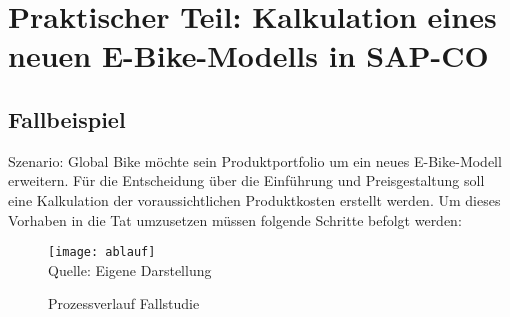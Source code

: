 \newpage
\section{Praktischer Teil: Kalkulation eines neuen E-Bike-Modells in SAP-CO} \label{infos}
\subsection{Fallbeispiel}
Szenario: Global Bike möchte sein Produktportfolio um ein neues E-Bike-Modell erweitern. Für die Entscheidung über die Einführung und Preisgestaltung soll eine Kalkulation der voraussichtlichen Produktkosten erstellt werden.
 Um dieses Vorhaben in die Tat umzusetzen müssen folgende Schritte befolgt werden:
\\
\begin{figure}[H]
    \caption{Prozessverlauf Fallstudie}\label{fig:process}
    \texttt{[image: ablauf]}
    \\
    Quelle: Eigene Darstellung
\end{figure}
    
